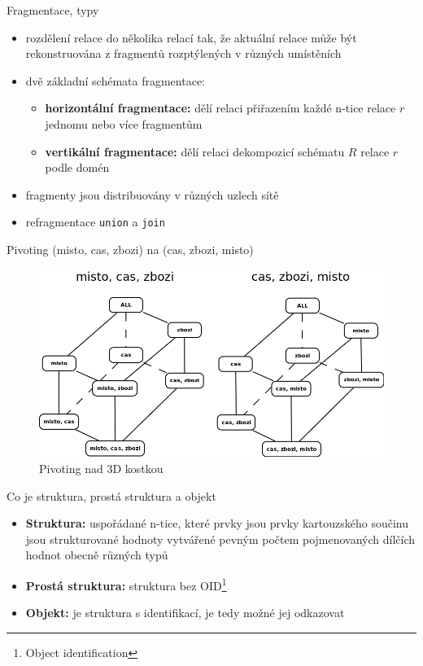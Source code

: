 \documentclass[12pt,a4paper,titlepage,final]{article}
\begin{document}
\begin{enumerate}
	{\large \item Fragmentace, typy }
	\begin{itemize}
		\item rozdělení relace do několika relací tak, že aktuální relace může být rekonstruována z fragmentů rozptýlených v různých umístěních
		\item dvě základní schémata fragmentace:
		\begin{itemize}
			\item \textbf{horizontální fragmentace:} dělí relaci přiřazením každé n-tice relace $r$ jednomu nebo více fragmentům
			\item \textbf{vertikální fragmentace:} dělí relaci dekompozicí schématu $R$ relace $r$ podle domén	
		\end{itemize}
		\item fragmenty jsou distribuovány v různých uzlech sítě
		\item refragmentace \texttt{union} a \texttt{join} 
	\end{itemize}
	
	{\large \item Pivoting (misto, cas, zbozi) na (cas, zbozi, misto)}
	\begin{figure}[h!]
		\centering
		\includegraphics[width=\textwidth]{pivot.png}
		\caption{Pivoting nad 3D kostkou}
	\end{figure}
	
	{\large \item Co je struktura, prostá struktura a objekt}
	\begin{itemize}
		\item \textbf{Struktura:} uspořádané n-tice, které prvky jsou prvky kartouzského součinu jsou strukturované hodnoty vytvářené pevným počtem pojmenovaných dílčích hodnot obecně různých typů
		\item \textbf{Prostá struktura:} struktura bez OID\footnote{Object identification}
		\item \textbf{Objekt:} je struktura s identifikací, je tedy možné jej odkazovat
	\end{itemize}
	

\end{enumerate}
\end{document}
